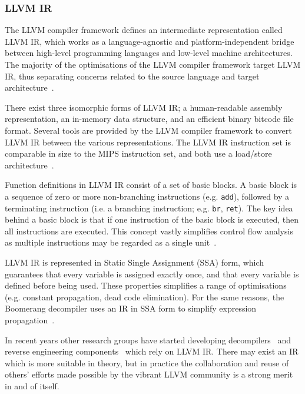 
\subsubsection{LLVM IR}
\label{sec:lit_review_llvm_ir}

The LLVM compiler framework defines an intermediate representation called LLVM IR, which works as a language-agnostic and platform-independent bridge between high-level programming languages and low-level machine architectures. The majority of the optimisations of the LLVM compiler framework target LLVM IR, thus separating concerns related to the source language and target architecture~\cite{llvm_architecture}.

There exist three isomorphic forms of LLVM IR; a human-readable assembly representation, an in-memory data structure, and an efficient binary bitcode file format. Several tools are provided by the LLVM compiler framework to convert LLVM IR between the various representations. The LLVM IR instruction set is comparable in size to the MIPS instruction set, and both use a load/store architecture~\cite{mips_ref,llvm_lang_ref}.

Function definitions in LLVM IR consist of a set of basic blocks. A basic block is a sequence of zero or more non-branching instructions (e.g. \texttt{add}), followed by a terminating instruction (i.e. a branching instruction; e.g. \texttt{br}, \texttt{ret}). The key idea behind a basic block is that if one instruction of the basic block is executed, then all instructions are executed. This concept vastly simplifies control flow analysis as multiple instructions may be regarded as a single unit~\cite{decomp_of_llvm}.

LLVM IR is represented in Static Single Assignment (SSA) form, which guarantees that every variable is assigned exactly once, and that every variable is defined before being used. These properties simplifies a range of optimisations (e.g. constant propagation, dead code elimination). For the same reasons, the Boomerang decompiler uses an IR in SSA form to simplify expression propagation~\cite{ssa_for_decomp}.

In recent years other research groups have started developing decompilers~\cite{decomp_of_llvm,retargetable_decomp} and reverse engineering components~\cite{mcsema} which rely on LLVM IR. There may exist an IR which is more suitable in theory, but in practice the collaboration and reuse of others' efforts made possible by the vibrant LLVM community is a strong merit in and of itself.

